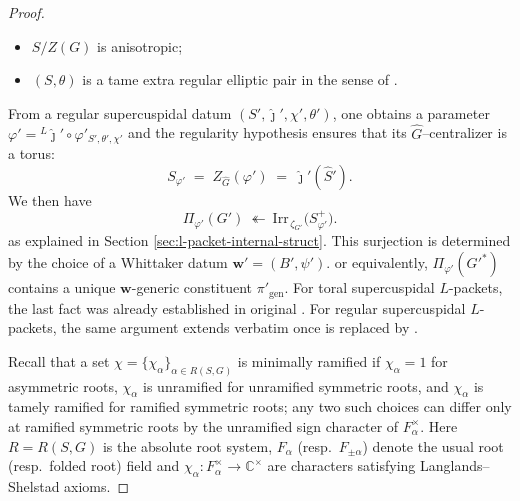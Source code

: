 \documentclass[american]{article}
\numberwithin{equation}{section}
\numberwithin{figure}{section}
\theoremstyle{plain}
\theoremstyle{definition}
\theoremstyle{remark}
\newcommand{\C}{\mathbb{C}}
\begin{document}
\begin{proof}
\begin{itemize}
  \item $S/Z(G)$ is anisotropic; 
  \item $(S,\theta)$ is a tame extra regular elliptic pair in the sense of \cite[Definition 3.7.5]{KalethaRegSC}.
\end{itemize}
From a regular supercuspidal datum $(S',\hat\jmath',\chi',\theta')$, one obtains a parameter 
\(\varphi'=\!{^{L}\!\hat\jmath'}\circ \varphi'_{S',\theta',\chi'}\) and the regularity hypothesis ensures that its $\widehat G$--centralizer is a torus:
\[
S_{\varphi'}\;=\;Z_{\widehat G}(\varphi')\;=\;\hat\jmath'(\widehat S').
\]
We then have
\[
  \Pi_{\varphi'}(G')\ \twoheadleftarrow\ \mathrm{Irr}_{\,\zeta_{G'}}\bigl(S_{\varphi'}^{+}\bigr).
\]
as explained in Section \ref{sec:l-packet-internal-struct}. This surjection is determined by the choice of a Whittaker datum \(\mathbf{w'}=(B',\psi')\). or equivalently, \(\Pi_{\varphi'}(G'^*)\) contains a unique \(\mathbf{w}\)-generic constituent \(\pi'_{\mathrm{gen}}\). For toral supercuspidal \(L\)-packets, the last fact was already established in original \cite[Lemma 6.2.2]{KalethaRegSC}. For regular supercuspidal $L$-packets, the same argument extends verbatim once \cite[Lemma 6.2.1]{KalethaRegSC} is replaced by \cite[Proposition 4.4.1]{FKS23}.

Recall that a set \(\chi=\{\chi_\alpha\}_{\alpha\in R(S,G)}\) is minimally ramified if \(\chi_\alpha=1\) for asymmetric roots, \(\chi_\alpha\) is unramified for unramified symmetric roots, and \(\chi_\alpha\) is tamely ramified for ramified symmetric roots; any two such choices can differ only at ramified symmetric roots by the unramified sign character of \(F_\alpha^\times\). Here $R=R(S,G)$ is the absolute root system, $F_{\alpha}$ (resp.\ $F_{\pm\alpha}$) denote the usual root (resp.\ folded root) field and \(\chi_\alpha: F_{\alpha}^{\times}\to \C^{\times}\) are characters satisfying Langlands--Shelstad axioms. 


\end{proof}
\end{document}

